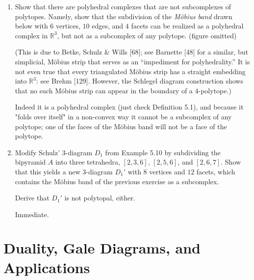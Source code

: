 \documentclass{article}
\begin{document}
\begin{enumerate}
\item Show that there are polyhedral complexes that are not subcomplexes of polytopes. Namely, show that the subdivision of the \emph{M\"obius band} drawn below with $6$ vertices, $10$ edges, and $4$ facets can be realized as a polyhedral complex in $\mathbb{R}^3$, but not as a subcomplex of any polytope. (figure omitted)

(This is due to Betke, Schulz \& Wills [68]; see Barnette [48] for a similar, but simplicial, M\"obius strip that serves as an ``impediment for polyhedrality.'' It is not even true that every triangulated M\"obius strip has a straight embedding into $\mathbb{R}^3$: see Brehm [129]. However, the Schlegel diagram construction shows that no such M\"obius strip can appear in the boundary of a $4$-polytope.)

\begin{solution}
    Indeed it is a polyhedral complex (just check Definition 5.1), and because it "folds over itself" in a non-convex way it cannot be a subcomplex of any polytope; one of the faces of the Möbius band will not be a face of the polytope.
\end{solution}

\item Modify Schulz' $3$-diagram $D_1$ from Example 5.10 by subdividing the bipyramid $A$ into three tetrahedra, $[2,3,6]$, $[2,5,6]$, and $[2,6,7]$. Show that this yields a new $3$-diagram $D_1'$ with $8$ vertices and $12$ facets, which contains the M\"obius band of the previous exercise as a subcomplex. 

Derive that $D_1'$ is not polytopal, either.

\begin{solution}
    Immediate.
\end{solution}
\end{enumerate}

\bigskip
\section{Duality, Gale Diagrams, and Applications}
\end{document}
